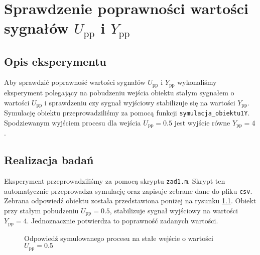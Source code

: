\chapter{Sprawdzenie poprawności wartości sygnałów $U_{\mathrm{pp}}$ i $Y_{\mathrm{pp}}$}
\label{zad1}

\section{Opis eksperymentu}
Aby sprawdzić poprawność wartości sygnałów $U_{\mathrm{pp}}$ i $Y_{\mathrm{pp}}$ wykonaliśmy eksperyment polegający na
pobudzeniu wejścia obiektu stałym sygnałem o wartości $U_{\mathrm{pp}}$ i sprawdzeniu czy sygnał wyjściowy stabilizuje 
się na wartości $Y_{\mathrm{pp}}$. Symulację obiektu przeprowadziliśmy za pomocą funkcji 
\verb+symulacja_obiektu1Y+. Spodziewanym wyjściem procesu dla wejścia $U_{\mathrm{pp}} = \num{0.5}$ jest
wyjście równe $Y_{\mathrm{pp}} = \num{4}$.

\section{Realizacja badań}
Eksperyment przeprowadziliśmy za pomocą skryptu \verb+zad1.m+. Skrypt ten automatycznie przeprowadza symulację 
oraz zapisuje zebrane dane do pliku \verb+csv+. Zebrana odpowiedź obiektu została przedstawiona poniżej na rysunku \ref{zad1_output}. 
Obiekt przy stałym pobudzeniu $U_{\mathrm{pp}}=\num{0.5}$, stabilizuje sygnał wyjściowy na wartości $Y_{\mathrm{pp}}=\num{4}$.
Jednoznacznie potwierdza to poprawność zadanych wartości.

\begin{figure}[b]
    \centering
    \caption{Odpowiedź symulowanego procesu na stałe wejście o wartości $U_{\mathrm{pp}}=\num{0.5}$}
    \label{zad1_output}
\end{figure}
